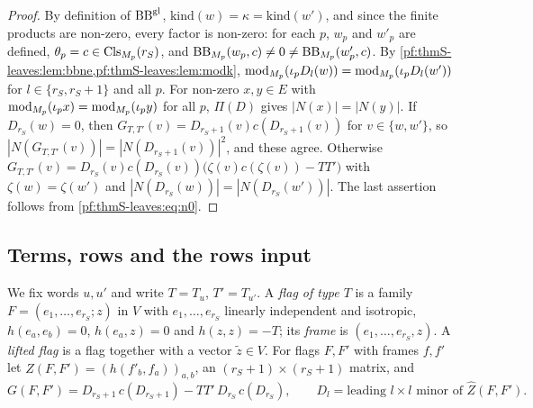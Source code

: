 \begin{proof}
By definition of $\mathrm{BB}^{\mathrm{gl}}$, $\mathrm{kind}(w)=\kappa=\mathrm{kind}(w')$, and since the finite products are non-zero,
every factor is non-zero: for each $p$, $w_p$ and $w'_p$ are defined, $\theta_p=c\in\mathrm{Cls}_{M_p}(r_S)$, and
$\mathrm{BB}_{M_p}(w_p,c)\ne0\ne\mathrm{BB}_{M_p}(w'_p,c)$. By \cref{pf:thmS-leaves:lem:bbne,pf:thmS-leaves:lem:modk},
$\mathrm{mod}_{M_p}(\iota_pD_l(w))=\mathrm{mod}_{M_p}(\iota_pD_l(w'))$ for $l\in\{r_S,r_S+1\}$ and all $p$. For non-zero
$x,y\in E$ with $\mathrm{mod}_{M_p}(\iota_px)=\mathrm{mod}_{M_p}(\iota_py)$ for all $p$, $\Pi(D)$ gives $|N(x)|=|N(y)|$. If
$D_{r_S}(w)=0$, then $G_{T,T'}(v)=D_{r_S+1}(v)c(D_{r_S+1}(v))$ for $v\in\{w,w'\}$, so $|N(G_{T,T'}(v))|=|N(D_{r_S+1}(v))|^2$, and
these agree. Otherwise $G_{T,T'}(v)=D_{r_S}(v)c(D_{r_S}(v))\bigl(\zeta(v)c(\zeta(v))-TT'\bigr)$ with $\zeta(w)=\zeta(w')$ and
$|N(D_{r_S}(w))|=|N(D_{r_S}(w'))|$. The last assertion follows from \eqref{pf:thmS-leaves:eq:n0}.
\end{proof}

\subsection{Terms, rows and the rows input}\label{pf:thmS-leaves:ss:terms}

We fix words $u,u'$ and write $T=T_u$, $T'=T_{u'}$. A \emph{flag of type $T$} is a family
$F=(e_1,\dots,e_{r_S};z)$ in $V$ with $e_1,\dots,e_{r_S}$ linearly independent and isotropic, $h(e_a,e_b)=0$,
$h(e_a,z)=0$ and $h(z,z)=-T$; its \emph{frame} is $(e_1,\dots,e_{r_S},z)$. A \emph{lifted flag} is a flag together with
a vector $\tilde z\in V$. For flags $F,F'$ with frames $f,f'$ let $\widehat Z(F,F')=(h(f'_b,f_a))_{a,b}$, an
$(r_S+1)\times(r_S+1)$ matrix, and
\[
G(F,F')=D_{r_S+1}\,c(D_{r_S+1})-TT'\,D_{r_S}\,c(D_{r_S}),\qquad D_l=\text{leading $l\times l$ minor of }\widehat Z(F,F').
\]

